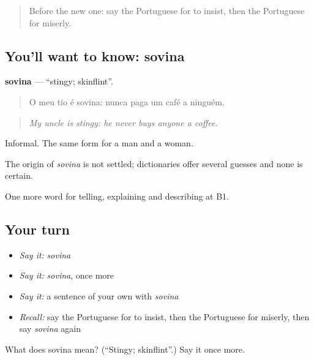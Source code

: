 \label{lesson:PT-C469-sovina}



\begin{quote}
Before the new one: say the Portuguese for to insist, then the Portuguese for miserly.
\end{quote}

\subsection*{You'll want to know: sovina}
\textbf{sovina} — \textquotedblleft{}stingy; skinflint\textquotedblright{}.

\begin{quote}
O meu tio é sovina: nunca paga um café a ninguém.
\end{quote}

\begin{quote}
\emph{My uncle is stingy: he never buys anyone a coffee.}
\end{quote}

Informal. The same form for a man and a woman.

\begin{cousinweb}
The origin of \emph{sovina} is not settled; dictionaries offer several guesses and none is certain.
\end{cousinweb}

\begin{grammarlens}[title={What you've built}]
One more word for telling, explaining and describing at B1.
\end{grammarlens}

\subsection*{Your turn}
\begin{itemize}
\raggedright
  \item \emph{Say it:} \emph{sovina}
  \item \emph{Say it:} \emph{sovina}, once more
  \item \emph{Say it:} a sentence of your own with \emph{sovina}
  \item \emph{Recall:} say the Portuguese for to insist, then the Portuguese for miserly, then say \emph{sovina} again
\end{itemize}

\begin{tcolorbox}[breakable,colback=teal!4,colframe=teal!35!black,title={Before you move on}]
What does sovina mean? (\textquotedblleft{}Stingy; skinflint\textquotedblright{}.) Say it once more.
\end{tcolorbox}
